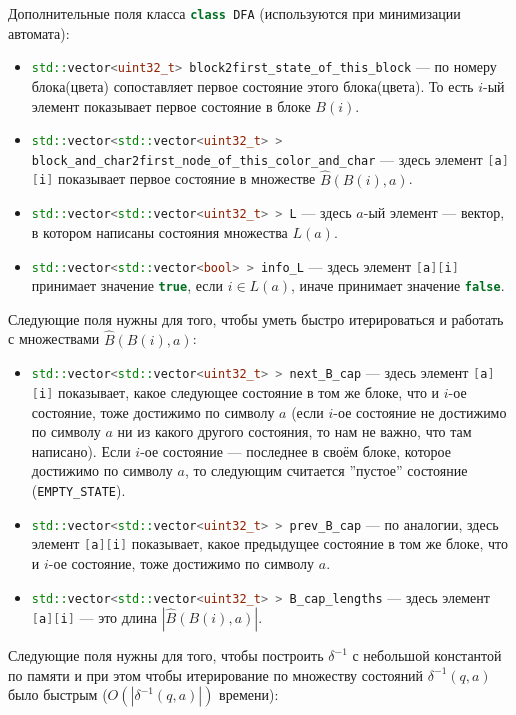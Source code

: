 \documentclass{article}
\begin{document}
  Дополнительные поля класса \lstinline[language=C++]!class DFA! (используются при минимизации автомата):
\begin{itemize}
  \item \lstinline[language=C++]!std::vector<uint32_t> block2first_state_of_this_block! --- по номеру блока(цвета) сопоставляет первое состояние этого блока(цвета). То есть $i$-ый элемент показывает первое состояние в блоке $B(i)$.
  \item \lstinline[language=C++]!std::vector<std::vector<uint32_t> > block_and_char2first_node_of_this_color_and_char! --- здесь элемент \lstinline[language=C++]![a][i]! показывает первое состояние в множестве $\hat B(B(i), a)$.
  \item \lstinline[language=C++]!std::vector<std::vector<uint32_t> > L! --- здесь $a$-ый элемент --- вектор, в котором написаны состояния множества $L(a)$.
  \item \lstinline[language=C++]!std::vector<std::vector<bool> > info_L! --- здесь элемент \lstinline[language=C++]![a][i]! принимает значение \lstinline[language=C++]!true!, если $i \in L(a)$, иначе принимает значение \lstinline[language=C++]!false!.
\end{itemize}
Следующие поля нужны для того, чтобы уметь быстро итерироваться и работать с множествами $\hat B(B(i), a)$:
\begin{itemize}
  \item \lstinline[language=C++]!std::vector<std::vector<uint32_t> > next_B_cap! --- здесь элемент \lstinline[language=C++]![a][i]! показывает, какое следующее состояние в том же блоке, что и $i$-ое состояние, тоже достижимо по символу $a$ (если $i$-ое состояние не достижимо по символу $a$ ни из какого другого состояния, то нам не важно, что там написано). Если $i$-ое состояние --- последнее в своём блоке, которое достижимо по символу $a$, то следующим считается ''пустое'' состояние (\lstinline[language=C++]!EMPTY_STATE!).
  \item \lstinline[language=C++]!std::vector<std::vector<uint32_t> > prev_B_cap! --- по аналогии, здесь элемент \lstinline[language=C++]![a][i]! показывает, какое предыдущее состояние в том же блоке, что и $i$-ое состояние, тоже достижимо по символу $a$.
  \item \lstinline[language=C++]!std::vector<std::vector<uint32_t> > B_cap_lengths! --- здесь элемент \lstinline[language=C++]![a][i]! --- это длина $|\hat B(B(i), a)|$.
\end{itemize}
Следующие поля нужны для того, чтобы построить $\delta^{-1}$ с небольшой константой по памяти и при этом чтобы итерирование по множеству состояний $\delta^{-1}(q, a)$ было быстрым ($O(|\delta^{-1}(q, a)|)$ времени):
\end{document}
